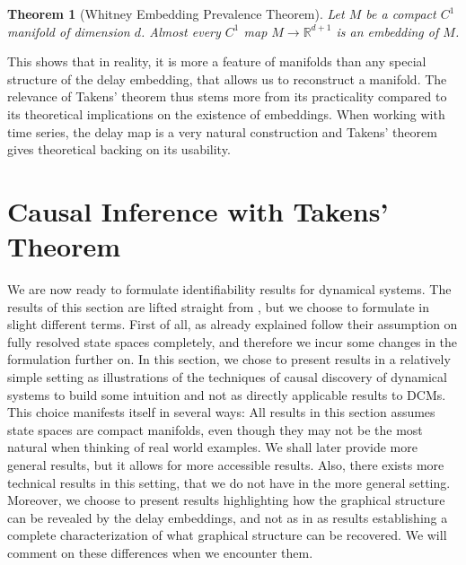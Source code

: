 \documentclass[11pt, a4paper]{memoir}
\theoremstyle{break}
\newtheorem{thm}{Theorem}
\theoremstyle{break}
\theoremstyle{nonumberplain}
\newcommand{\mR}{\mathbb{R}}
\begin{document}
\begin{thm}[Whitney Embedding Prevalence Theorem]
Let $M$ be a compact $C^1$ manifold of dimension $d$. Almost every $C^1$ map $M\to \mR^{d+1}$ is an embedding of $M$.
\end{thm}
This shows that in reality, it is more a feature of manifolds than any special structure of the delay embedding, that allows us to reconstruct a manifold. The relevance of Takens' theorem thus stems more from its practicality compared to its  theoretical implications on the existence of embeddings. When working with time series, the delay map is a very natural construction and Takens' theorem gives theoretical backing on its usability. 

\section{Causal Inference with Takens' Theorem}
We are now ready to formulate identifiability results for dynamical systems. The results of this section are lifted straight from \cite{mathFound}, but we choose to formulate in slight different terms. First of all, as already explained follow their assumption on fully resolved state spaces completely, and therefore we incur some changes in the formulation further on. In this section, we chose to present results in a relatively simple setting as illustrations of the techniques of causal discovery of dynamical systems to build some intuition and not as directly applicable results to DCMs. This choice manifests itself in several ways: All results in this section assumes state spaces are compact manifolds, even though they may not be the most natural when thinking of real world examples. We shall later provide more general results, but it allows for more accessible results. Also, there exists more technical results in this setting, that we do not have in the more general setting. Moreover, we choose to present results highlighting how the graphical structure can be revealed by the delay embeddings, and not as in \cite{mathFound} as results establishing a complete characterization of what graphical structure can be recovered. We will comment on these differences when we encounter them.\\\\
\end{document}
